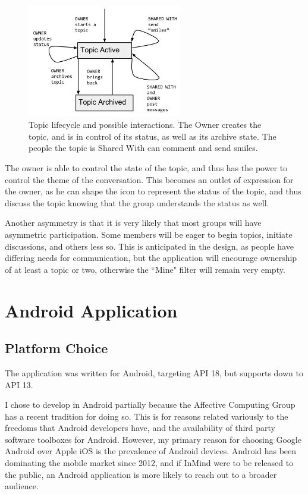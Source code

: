         \begin{figure}
        \centering
        \includegraphics[width=0.6\textwidth]{topic_lifecycle.jpg}
        \caption{Topic lifecycle and possible interactions.
        The Owner creates the topic, and is in control of its status,
        as well as its archive state.
        The people the topic is Shared With can comment and send smiles.}
        \label{fig:topic_lifecycle}
        \end{figure}

      The owner is able to control the state of the topic,
      and thus has the power to control the theme of the conversation.
      This becomes an outlet of expression for the owner,
      as he can shape the icon to represent the status of the topic,
      and thus discuss the topic knowing that the group understands the status as well.

      Another asymmetry is that it is very likely that most groups will
      have asymmetric participation.
      Some members will be eager to begin topics, initiate discussions,
      and others less so.
      This is anticipated in the design,
      as people have differing needs for communication,
      but the application will encourage ownership of at least a topic or two,
      otherwise the ``Mine" filter will remain very empty.

  \section{Android Application}

    \subsection{Platform Choice}
    The application was written for Android, targeting API 18,
    but supports down to API 13.

    I chose to develop in Android partially because the Affective Computing Group
    has a recent tradition for doing so.
    This is for reasons related variously to the freedoms that Android developers have,
    and the availability of third party software toolboxes for Android.
    However, my primary reason for choosing Google Android over Apple iOS is
    the prevalence of Android devices.
    Android has been dominating the mobile market since 2012,
    and if InMind were to be released to the public,
    an Android application is more likely to reach out to a broader audience.

